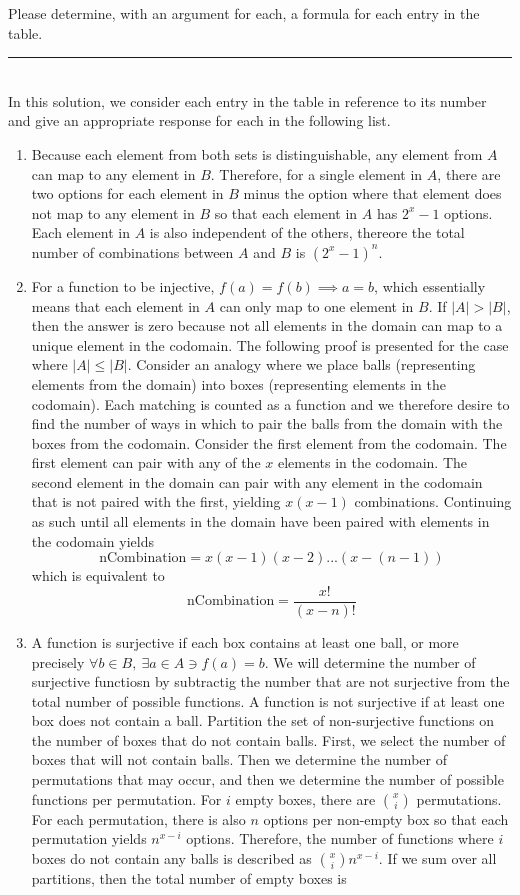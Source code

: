 \documentclass{article}
\newcommand{\statementsep}{\leavevmode\\[0.005in] \rule[\baselineskip/4]{\textwidth}{0.4pt}\leavevmode\\[0.005in]}
\begin{document}
\noindent Please determine, with an argument for each, a formula for each entry in 
the table.
\statementsep
In this solution, we consider each entry in the table in reference to its number and give an appropriate response for each in the following list.
\begin{enumerate}
\item Because each element from both sets is distinguishable, any element from $A$ can map to any element in $B$. Therefore, for a single element in $A$, there are two options for each element in $B$ minus the option where that element does not map to any element in $B$ so that each element in $A$ has $2^x - 1$ options. Each element in $A$ is also independent of the others, thereore the total number of combinations between $A$ and $B$ is $(2^x - 1)^n$. 
\item For a function to be injective, $f(a) = f(b) \implies a = b$, which essentially means that each element in $A$ can only map to one element in $B$. If $\lvert A \rvert > \lvert B \rvert$, then the answer is zero because not all elements in the domain can map to a unique element in the codomain. The following proof is presented for the case where $\lvert A \rvert \le \lvert B \rvert$. Consider an analogy where we place balls (representing elements from the domain) into boxes (representing elements in the codomain). Each matching is counted as a function and we therefore desire to find the number of ways in which to pair the balls from the domain with the boxes from the codomain. Consider the first element from the codomain.  The first element can pair with any of the $x$ elements in the codomain. The second element in the domain can pair with any element in the codomain that is not paired with the first, yielding $x(x - 1)$ combinations. Continuing as such until all elements in the domain have been paired with elements in the codomain yields 
\begin{equation*}
	\text{nCombination} = x(x-1)(x-2)...(x-(n-1))
\end{equation*}
which is equivalent to 
\begin{equation*}
\text{nCombination} = \frac{x!}{(x - n)!}
\end{equation*}
\item A function is surjective if each box contains at least one ball, or more precisely $\forall b \in B, \ \exists a \in A \ni f(a) = b$. We will determine the number of surjective functiosn by subtractig the number that are not surjective from the total number of possible functions. A function is not surjective if at least one box does not contain a ball. Partition the set of non-surjective functions on the number of boxes that do not contain balls. First, we select the number of boxes that will not contain balls. Then we determine the number of permutations that may occur, and then we determine the number of possible functions per permutation. For $i$ empty boxes, there are ${x \choose i}$ permutations. For each permutation, there is also $n$ options per non-empty box so that each permutation yields $n^{x - i}$ options. Therefore, the number of functions where $i$ boxes do not contain any balls is described as ${x \choose i}n^{x - i}$. If we sum over all partitions, then the total number of empty boxes is

\end{enumerate}
\end{document}
